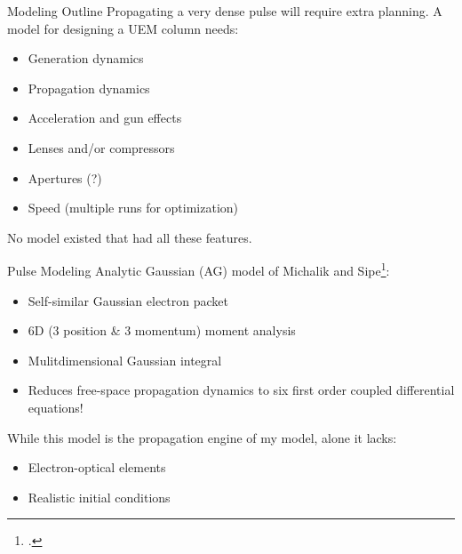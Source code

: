 \begin{frame}{Modeling Outline}
Propagating a very dense pulse will require extra planning. A model for designing a UEM column needs:
	\begin{itemize}[<+->]
	    \item Generation dynamics
		\item Propagation dynamics
		\item Acceleration and gun effects
		\item Lenses and/or compressors	
		\item Apertures (?)
		\item Speed (multiple runs for optimization)
	\end{itemize}
No model existed that had all these features.
\end{frame}

\begin{frame}{Pulse Modeling}
	Analytic Gaussian (AG) model of Michalik and Sipe\footcite{michalik_analytic_2006}: 
	\begin{itemize}
		\item<2-> Self-similar Gaussian electron packet
		\item<3-> 6D (3 position \& 3 momentum) moment analysis
		\item<4-> Mulitdimensional Gaussian integral
		\item<5->[$\Rightarrow$] Reduces free-space propagation dynamics to six first order coupled differential equations!
	\end{itemize}
    While this model is the propagation engine of my model, alone it lacks:
    \begin{itemize}
      \item<6-> Electron-optical elements
      \item<7-> Realistic initial conditions
    \end{itemize}
\end{frame}

